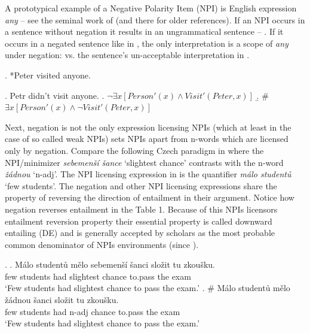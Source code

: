 \documentclass[12pt]{scrartcl}
\begin{document}
A prototypical example of a Negative Polarity Item (NPI) is English expression \emph{any} -- see the seminal work of \cite{kadmon1993any} (and there for older references). If an NPI occurs in a sentence without negation it results in an ungrammatical sentence -- \Next. If it occurs in a negated sentence like in \NNext, the only interpretation is a scope of \textit{any} under negation: \NNext[a] vs. the sentence's un-acceptable interpretation in \NNext[b].

\ex. *Peter visited anyone.

\ex. Petr didn't visit anyone. \a.
\(\neg \exists x[Person'(x) \wedge Visit'(Peter,x)]\)
\b. \#$\exists x[Person'(x) \wedge \neg Visit'(Peter,x)]$

Next, negation is not the only expression licensing NPIs (which at least in the case of so called weak NPIs) sets NPIs apart from n-words which are licensed only by negation. Compare the following Czech paradigm in \Next where the NPI/minimizer \textit{sebemenší šance} `slightest chance' contrasts with the n-word \textit{žádnou} `n-adj'. The NPI licensing expression in \Next[a] is the quantifier \textit{málo studentů} `few students'. The negation and other  NPI licensing expressions share the property of reversing the direction of entailment in their argument. Notice how negation reverses entailment in the Table 1. Because of this NPIs licensors entailment reversion property their essential property is called downward entailing (DE) and is generally accepted by scholars as the most probable common denominator of NPIs environments (since \citealt{ladusaw1992expressing}).


\ex. \ag. Málo studentů mělo sebemenší šanci složit tu zkoušku. \\
few students had slightest chance to.pass the exam\\
`Few students had slightest chance to pass the exam.'
\bg. \# Málo studentů mělo žádnou šanci složit tu zkoušku. \\
few students had n-adj chance to.pass the exam\\
`Few students had slightest chance to pass the exam.'
\end{document}
